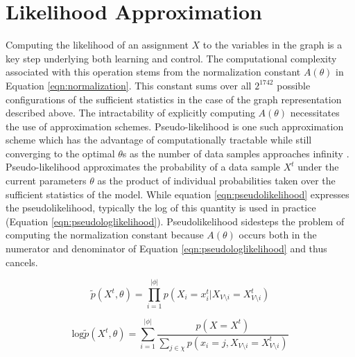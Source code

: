 \documentclass{article} %
\begin{document}
\section{Likelihood Approximation}
Computing the likelihood of an assignment $X$ to the variables in the graph is a key step underlying both learning and control. The computational complexity associated with this operation stems from the normalization constant $A(\theta)$ in Equation \ref{eqn:normalization}. This constant sums over all $2^{1742}$ possible configurations of the sufficient statistics in the case of the graph representation described above. The intractability of explicitly computing $A(\theta)$ necessitates the use of approximation schemes. Pseudo-likelihood is one such approximation scheme which has the advantage of computationally tractable while still converging to the optimal $\theta$s as the number of data samples approaches infinity \cite{besag75}. Pseudo-likelihood approximates the probability of a data sample $X^t$ under the current parameters $\theta$ as the product of individual probabilities taken over the sufficient statistics of the model. While equation \ref{eqn:pseudolikelihood} expresses the pseudolikelihood, typically the log of this quantity is used in practice (Equation \ref{eqn:pseudologlikelihood}). Pseudolikelihood sidesteps the problem of computing the normalization constant because $A(\theta)$ occurs both in the numerator and denominator of Equation \ref{eqn:pseudologlikelihood} and thus cancels.

\begin{equation}
\tilde{p}(X^t,\theta) = \prod_{i=1}^{|\phi|} p(X_i = x_i^t | X_{V\setminus i} = X_{V\setminus i}^t) 
\label{eqn:pseudolikelihood}
\end{equation}

\begin{equation}
\textrm{log}\tilde{p}(X^t,\theta) = \sum_{i=1}^{|\phi|} \frac{p(X = X^t)}{\sum_{j \in \chi} p(x_i = j, X_{V\setminus i} = X_{V\setminus i}^t)}
\label{eqn:pseudologlikelihood}
\end{equation}

\end{document}
